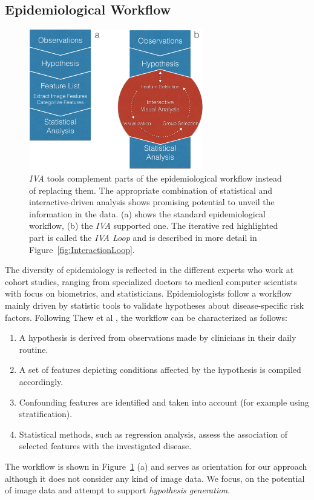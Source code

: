 \documentclass[journal]{style/vgtc} 			          %
\begin{document}
\subsection{Epidemiological Workflow} \label{EpidemiologicalWorkflow}
\begin{figure}[htb]
 \centering
 \includegraphics[width=3.0in]{figures/workflow_comparison}
 \caption{\emph{IVA} tools complement parts of the epidemiological workflow instead of replacing them. The appropriate combination of statistical and interactive-driven analysis shows promising potential to unveil the information in the data. (a) shows the standard epidemiological workflow, (b) the \emph{IVA} supported one. The iterative red highlighted part is called the \emph{IVA Loop} and is described in more detail in Figure~\ref{fig:InteractionLoop}.}
  \label{fig:WorkflowComparison}
\end{figure}
The diversity of epidemiology is reflected in the different experts who work at cohort studies, ranging from specialized doctors to medical computer scientists with focus on biometrics, and statisticians.
%
Epidemiologists follow a workflow mainly driven by statistic tools to validate hypotheses about disease-specific risk factors.
%
Following Thew et al \cite{Thew2009}, the workflow can be characterized as follows:
%
\begin{enumerate}
	\item A hypothesis is derived from observations made by clinicians in their daily routine.
%
	\item A set of features depicting conditions affected by the hypothesis is compiled accordingly.
%
	\item Confounding features are identified and taken into account (for example using stratification).
%
	\item Statistical methods, such as regression analysis, assess the association of selected features with the investigated disease.
%
\end{enumerate}
The workflow is shown in Figure~\ref{fig:WorkflowComparison} (a) and serves as orientation for our approach although it does not consider any kind of image data.
%
We focus, on the potential of image data and attempt to support \emph{hypothesis generation}.
\end{document}

